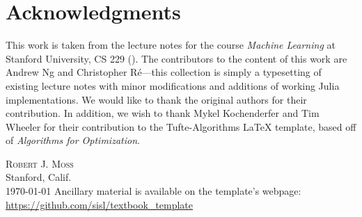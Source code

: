 \chapter*{Acknowledgments}

This work is taken from the lecture notes for the course \textit{Machine Learning} at Stanford University, CS 229 (). %
The contributors to the content of this work are Andrew Ng and Christopher R\'e---this collection is simply a typesetting of existing lecture notes with minor modifications and additions of working Julia implementations. We would like to thank the original authors for their contribution. %
In addition, we wish to thank Mykel Kochenderfer and Tim Wheeler for their contribution to the Tufte-Algorithms \LaTeX{} template, based off of \textit{Algorithms for Optimization}.\cite{Kochenderfer2019}




\vspace{5ex}
\noindent\textsc{Robert J. Moss}\\
Stanford, Calif.\\
\psetdate\today
\vfill
\noindent Ancillary material is available on the template's webpage:\\
\noindent\url{https://github.com/sisl/textbook_template}

